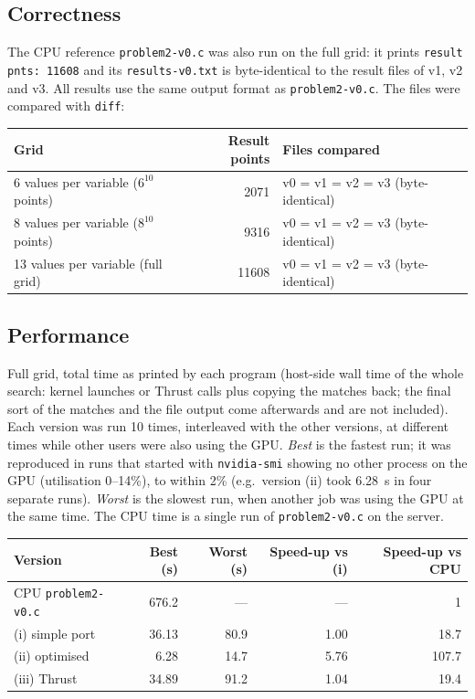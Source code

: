 \documentclass[11pt]{article}
\begin{document}
\subsection*{Correctness}
The CPU reference \texttt{problem2-v0.c} was also run on the full grid: it prints \texttt{result pnts: 11608} and its \texttt{results-v0.txt} is byte-identical to the result files of v1, v2 and v3.
All results use the same output format as \texttt{problem2-v0.c}. The files
were compared with \texttt{diff}:
\begin{center}
\begin{tabular}{lrl}
\toprule
Grid & Result points & Files compared \\
\midrule
6 values per variable ($6^{10}$ points)  & 2071  & v0 = v1 = v2 = v3 (byte-identical) \\
8 values per variable ($8^{10}$ points)  & 9316  & v0 = v1 = v2 = v3 (byte-identical) \\
13 values per variable (full grid)       & 11608 & v0 = v1 = v2 = v3 (byte-identical) \\
\bottomrule
\end{tabular}
\end{center}

\subsection*{Performance}
Full grid, total time as printed by each program (host-side wall time of the
whole search: kernel launches or Thrust calls plus copying the matches back;
the final sort of the matches and the file output come afterwards and are not
included). Each version was run 10 times, interleaved with the other
versions, at different times while other users were also using the GPU.
\emph{Best} is the fastest run; it was reproduced in runs that started with
\texttt{nvidia-smi} showing no other process on the GPU (utilisation 0--14\%),
to within 2\% (e.g.\ version (ii) took 6.28~s in four separate runs). \emph{Worst} is the slowest run, when another
job was using the GPU at the same time. The CPU time is a single run of
\texttt{problem2-v0.c} on the server.

\begin{center}
\begin{tabular}{lrrrr}
\toprule
Version & Best (s) & Worst (s) & Speed-up vs (i) & Speed-up vs CPU \\
\midrule
CPU \texttt{problem2-v0.c} & 676.2 & --- & --- & 1 \\
(i) simple port    & 36.13 & 80.9 & 1.00 & 18.7 \\
(ii) optimised     & 6.28 & 14.7 & 5.76 & 107.7 \\
(iii) Thrust       & 34.89 & 91.2 & 1.04 & 19.4 \\
\bottomrule
\end{tabular}
\end{center}
\end{document}
